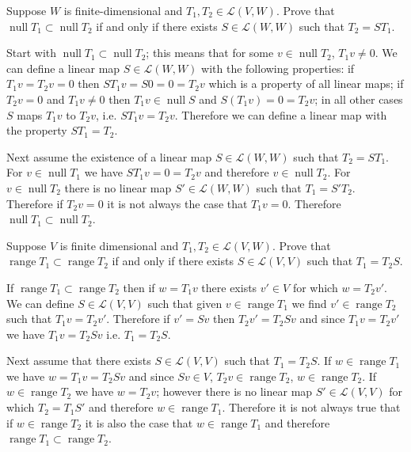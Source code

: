 \documentclass[11pt,a4paper]{scrartcl}
\DeclareMathOperator{\range}{range}
\DeclareMathOperator{\nspace}{null}
\newcommand{\lmap}[2]{\mathcal{L}(#1,#2)}
\newcounter{problem}
\begin{document}
\begin{problem}[3.B.24]
    {
            Suppose $W$ is finite-dimensional and $T_1,T_2 \in \lmap{V}{W}$. Prove that $\nspace T_1 \subset \nspace T_2$ if and only if there exists $S \in \lmap{W}{W}$ such that $T_2=ST_1$.
    }
    {
        Start with $\nspace T_1 \subset \nspace T_2$; this means that for some $v \in \nspace T_2$, $T_1v \neq 0$. We can define a linear map $S\in \lmap{W}{W}$  with the following properties: if $T_1v=T_2v=0$ then $ST_1v=S0=0=T_2v$ which is a property of all linear maps; if $T_2v=0$ and $T_1v\neq 0$ then $T_1v \in \nspace S$ and
        $S(T_1v)=0=T_2v$; in all other cases $S$ maps $T_1v$ to $T_2v$, i.e. $ST_1v=T_2v$. Therefore we can define a linear map with the property $ST_1=T_2$.
        
        Next assume the existence of a linear map
        $S \in \lmap{W}{W}$ such that $T_2=ST_1$. For 
        $v \in \nspace T_1$ we have $ST_1v=0=T_2v$ and therefore
        $v \in \nspace T_2$. For $v \in \nspace T_2$ there is no linear map $S' \in \lmap{W}{W}$ such that $T_1=S'T_2$.
        Therefore if $T_2v=0$ it is not always the case that
        $T_1v=0$. Therefore $\nspace T_1 \subset \nspace T_2$.
    }
\end{problem}
    
\begin{problem}[3.B.25]
{    
    Suppose $V$ is finite dimensional and $T_1,T_2 \in \lmap{V}{W}$. Prove that $\range T_1 \subset \range T_2$ if and only if there exists $S \in \lmap{V}{V}$ such that $T_1=T_2 S$.
}
{
If $\range T_1 \subset \range T_2$ then if $w=T_1v$
there exists $v'\in V$ for which $w=T_2 v'$. We can define
$S\in \lmap{V}{V}$ such that given $v \in \range T_1$
we find $v' \in \range T_2$ such that $T_1v=T_2v'$. Therefore if $v'=Sv$ then $T_2v'=T_2Sv$ and since $T_1v=T_2v'$ we have $T_1v=T_2Sv$ i.e. $T_1=T_2S$.

Next assume that there exists $S \in \lmap{V}{V}$ such that $T_1=T_2 S$. If $w \in \range T_1$ we have
$w=T_1v=T_2Sv$ and since $Sv \in V$, $T_2v \in \range T_2$,
$w \in \range T_2$. If $w \in \range T_2$ we have $w=T_2v$;
however there is no linear map $S'\in \lmap{V}{V}$ for which $T_2=T_1S'$ and therefore $w \in \range T_1$. Therefore it is not always true that if $w \in \range T_2$ it is also the case that $w \in \range T_1$ and therefore $\range T_1 \subset \range T_2$.
}
\end{problem}
\end{document}
